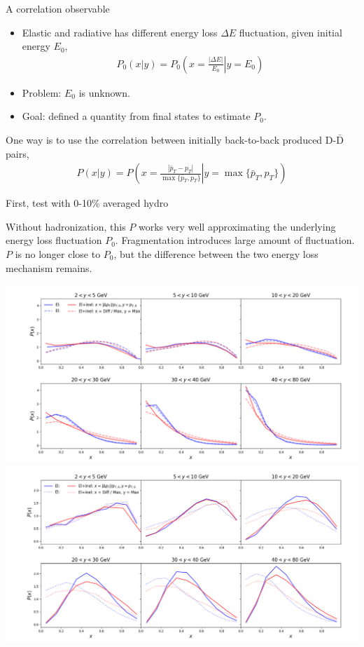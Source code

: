 \documentclass[11pt]{beamer}
\begin{document}
\begin{frame}{A correlation observable}
\begin{itemize}
\item Elastic and radiative has different energy loss $\Delta E$ fluctuation, given initial energy $E_0$, 
\begin{eqnarray}
\nonumber
P_0(x|y) = P_0\left(\left.x = \frac{|\Delta E|}{E_0} \right| y = E_0\right)
\end{eqnarray}
\item Problem: $E_0$ is unknown.
\item Goal: defined a quantity from final states to estimate $P_0$. 
\end{itemize}
One way is to use the correlation between initially back-to-back produced $\mathrm{D}$-$\bar{\mathrm{D}}$ pairs,
\begin{eqnarray}
\nonumber
P(x|y) = P\left(\left.x = \frac{|\bar{p}_T - p_T|}{\max\{\bar{p}_T, p_T\}} \right| y = \max\{\bar{p}_T, p_T\} \right)
\end{eqnarray}
\end{frame}


\begin{frame}{First, test with 0-10\% averaged hydro}
\begin{overprint}
Without hadronization, this $P$ works very well approximating the underlying energy loss fluctuation $P_0$.
Fragmentation introduces large amount of fluctuation. $P$ is no longer close to $P_0$, but the difference between the two energy loss mechanism remains.
\end{overprint}

\begin{overprint}
\includegraphics[width=\textwidth]{fig/Event-avg-quark-fluct.png}
\includegraphics[width=\textwidth]{fig/Event-avg-meson-fluct.png}
\end{overprint}

\end{frame}
\end{document}
